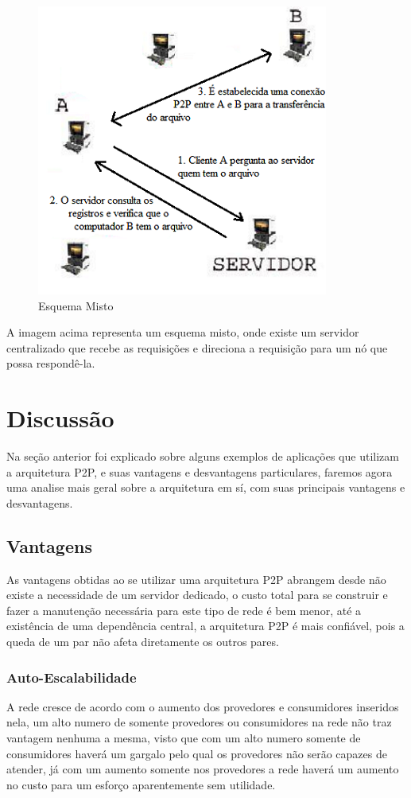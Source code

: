 \documentclass[a4paper]{article}
\begin{document}
\begin{figure} [!ht]
\begin{center}
  \includegraphics{img//misto.png}
  \caption{Esquema Misto \cite{sisp2p}} 
\end{center}
\end{figure}
A imagem acima representa um esquema misto, onde existe um servidor centralizado que recebe as requisições e direciona a requisição para um nó que possa respondê-la.

\section{Discussão}
Na seção anterior foi explicado sobre alguns exemplos de aplicações que utilizam a arquitetura P2P, e suas vantagens e desvantagens particulares, faremos agora uma analise mais geral sobre a arquitetura em sí, com suas principais vantagens e desvantagens.

\subsection{Vantagens}
As vantagens obtidas ao se utilizar uma arquitetura P2P abrangem desde não existe a necessidade de um servidor dedicado, o custo total para se construir e fazer a manutenção necessária para este tipo de rede é bem menor, até a existência de uma dependência central, a arquitetura P2P é mais confiável, pois a queda de um par não afeta diretamente os outros pares.

\subsubsection{Auto-Escalabilidade}
A rede cresce de acordo com o aumento dos provedores e consumidores inseridos nela, um alto numero de somente provedores ou consumidores na rede não traz vantagem nenhuma a mesma, visto que com um alto numero somente de consumidores haverá um gargalo pelo qual os provedores não serão capazes de atender, já com um aumento somente nos provedores a rede haverá um aumento no custo para um esforço aparentemente sem utilidade.\cite{ACohenBAD}
\end{document}
